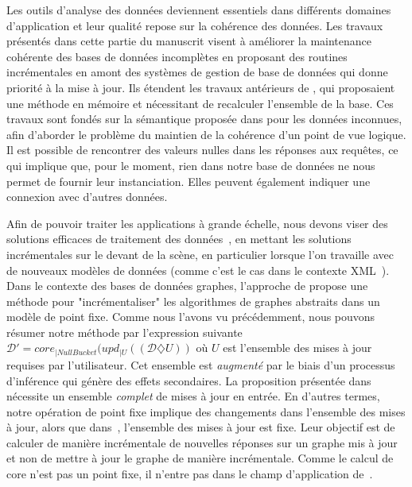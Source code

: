 Les outils d'analyse des données deviennent essentiels dans différents domaines d'application et leur qualité repose sur la cohérence des données.
Les travaux présentés dans cette partie du manuscrit visent à améliorer la maintenance cohérente des bases de données incomplètes en proposant des routines incrémentales en amont des systèmes de gestion de base de données qui donne priorité à la mise à jour.
Ils étendent les travaux antérieurs de \cite{chabinConsistentUpdatingDatabases2020}, qui proposaient une méthode en mémoire et nécessitant de recalculer l'ensemble de la base.
Ces travaux sont fondés sur la sémantique proposée dans \cite{reiterSoundSometimesComplete1986} pour les données inconnues, afin d'aborder le problème du maintien de la cohérence d'un point de vue logique.
Il est possible de rencontrer des valeurs nulles dans les réponses aux requêtes, ce qui implique que, pour le moment, rien dans notre base de données ne nous permet de fournir leur instanciation.
Elles peuvent également indiquer une connexion avec d'autres données.

Afin de pouvoir traiter les applications à grande échelle, nous devons viser des solutions efficaces de traitement des données~\cite{sirangeloRepresentingQueryingIncomplete2014}, en mettant les solutions incrémentales sur le devant de la scène, en particulier lorsque l'on travaille avec de nouveaux modèles de données (comme c'est le cas dans le contexte XML~\cite{bouchouUpdatesIncrementalValidation2003,abraoIncrementalConstraintChecking2004,balminIncrementalValidationXML2004}).
Dans le contexte des bases de données graphes, l'approche de \cite{fanIncrementalizingGraphAlgorithms2021} propose une méthode pour "incrémentaliser" les algorithmes de graphes abstraits dans un modèle de point fixe.
Comme nous l'avons vu précédemment, nous pouvons résumer notre méthode par l'expression suivante
$\mathcal{D}' = core_{|NullBucket}(upd_{|U}((\mathcal{D}\diamondsuit U))$ où $U$ est l'ensemble des mises à jour requises par l'utilisateur.
Cet ensemble est \emph{augmenté} par le biais d'un processus d'inférence qui génère des effets secondaires.
La proposition présentée dans~\cite{fanIncrementalizingGraphAlgorithms2021} nécessite un ensemble \emph{complet} de mises à jour en entrée.
En d'autres termes, notre opération de point fixe implique des changements dans l'ensemble des mises à jour, alors que dans~\cite{fanIncrementalizingGraphAlgorithms2021}, l'ensemble des mises à jour est fixe.
Leur objectif est de calculer de manière incrémentale de nouvelles réponses sur un graphe mis à jour et non de mettre à jour le graphe de manière incrémentale.
Comme le calcul de \gls{core} n'est pas un point fixe, il n'entre pas dans le champ d'application de~\cite{fanIncrementalizingGraphAlgorithms2021}.

